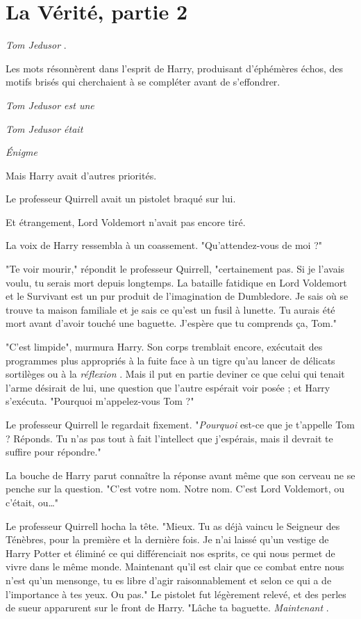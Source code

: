 
\chapter{La Vérité, partie 2}

\emph{Tom Jedusor} .

Les mots résonnèrent dans l'esprit de Harry, produisant d'éphémères échos, des motifs brisés qui cherchaient à se compléter avant de s'effondrer.

\emph{Tom Jedusor est une} 

\emph{Tom Jedusor était} 

\emph{Énigme} 

Mais Harry avait d'autres priorités.

Le professeur Quirrell avait un pistolet braqué sur lui.

Et étrangement, Lord Voldemort n'avait pas encore tiré.

La voix de Harry ressembla à un coassement. "Qu'attendez-vous de moi ?"

"Te voir mourir," répondit le professeur Quirrell, "certainement pas. Si je l'avais voulu, tu serais mort depuis longtemps. La bataille fatidique en Lord Voldemort et le Survivant est un pur produit de l'imagination de Dumbledore. Je sais où se trouve ta maison familiale et je sais ce qu'est un fusil à lunette. Tu aurais été mort avant d'avoir touché une baguette. J'espère que tu comprends ça, Tom."

"C'est limpide", murmura Harry. Son corps tremblait encore, exécutait des programmes plus appropriés à la fuite face à un tigre qu'au lancer de délicats sortilèges ou à la \emph{réflexion} . Mais il put en partie deviner ce que celui qui tenait l'arme désirait de lui, une question que l'autre espérait voir posée ; et Harry s'exécuta. "Pourquoi m'appelez-vous Tom ?"

Le professeur Quirrell le regardait fixement. "\emph{Pourquoi}  est-ce que je t'appelle Tom ? Réponds. Tu n'as pas tout à fait l'intellect que j'espérais, mais il devrait te suffire pour répondre."

La bouche de Harry parut connaître la réponse avant même que son cerveau ne se penche sur la question. "C'est votre nom. Notre nom. C'est Lord Voldemort, ou c'était, ou…"

Le professeur Quirrell hocha la tête. "Mieux. Tu as déjà vaincu le Seigneur des Ténèbres, pour la première et la dernière fois. Je n'ai laissé qu'un vestige de Harry Potter et éliminé ce qui différenciait nos esprits, ce qui nous permet de vivre dans le même monde. Maintenant qu'il est clair que ce combat entre nous n'est qu'un mensonge, tu es libre d'agir raisonnablement et selon ce qui a de l'importance à tes yeux. Ou pas." Le pistolet fut légèrement relevé, et des perles de sueur apparurent sur le front de Harry. "Lâche ta baguette. \emph{Maintenant} .

